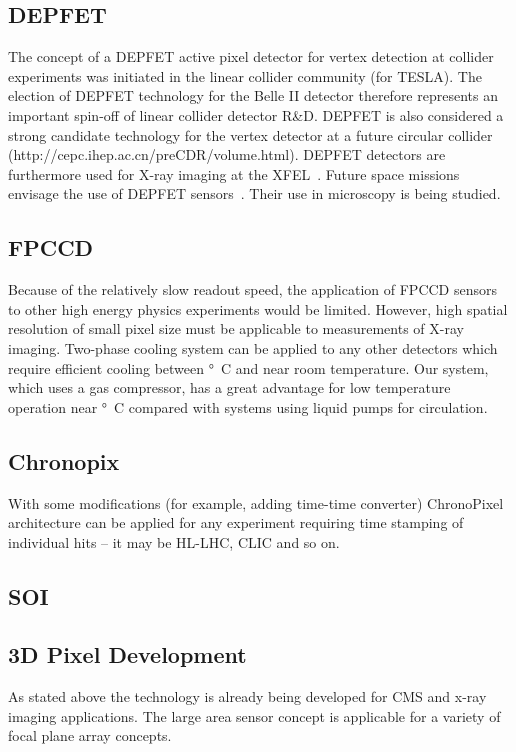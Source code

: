 \subsection{DEPFET}
The concept of a DEPFET active pixel detector for vertex detection at collider experiments was initiated in the linear collider community (for TESLA). The election of DEPFET technology for the Belle II detector therefore represents an important spin-off of linear collider detector R\&D. DEPFET is also considered a strong candidate technology for the vertex detector at a future circular collider (http://cepc.ihep.ac.cn/preCDR/volume.html). DEPFET detectors are furthermore used for X-ray imaging at the XFEL~\cite{xfel}. Future space missions envisage the use of DEPFET sensors~\cite{bepicolombo}. Their use in microscopy is being studied.

\subsection{FPCCD}
    Because of the relatively slow readout speed, the application of FPCCD sensors to other high energy physics experiments would be limited. However, high spatial resolution of small pixel size must be applicable to measurements of X-ray imaging.
    Two-phase  cooling system can be applied to any other detectors which require efficient cooling between \unit[-40]{\degree C} and near room temperature. Our system, which uses a  gas compressor, has a great advantage for low temperature operation near \unit[-40]{\degree C} compared with systems using liquid pumps for circulation.

\subsection{Chronopix}
     With some modifications (for example, adding time-time converter) ChronoPixel architecture can be applied for any experiment requiring time stamping of individual hits -- it may be HL-LHC, CLIC and so on.

\subsection{SOI}

\subsection{3D Pixel Development}
As stated above the technology is already being developed for CMS and x-ray imaging applications.  The large area sensor concept is applicable for a variety of focal plane array concepts.

